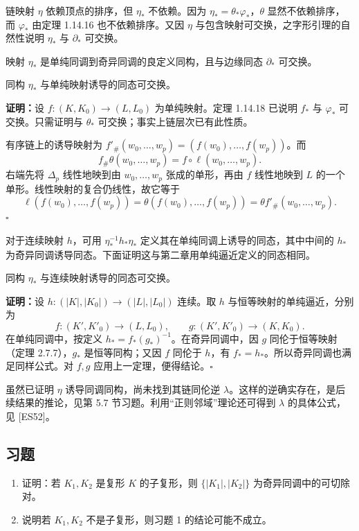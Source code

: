 链映射 $\eta$ 依赖顶点的排序，但 $\eta_*$ 不依赖。因为 $\eta_*=\theta_*\varphi_*$，$\theta$ 显然不依赖排序，而 $\varphi_*$ 由定理 1.14.16 也不依赖排序。又因 $\eta$ 与包含映射可交换，之字形引理的自然性说明 $\eta_*$ 与 $\partial_*$ 可交换。

映射 $\eta_*$ 是单纯同调到奇异同调的良定义同构，且与边缘同态 $\partial_*$ 可交换。

同构 $\eta_*$ 与单纯映射诱导的同态可交换。

\textbf{证明：}设 $f:(K,K_0)\to(L,L_0)$ 为单纯映射。定理 1.14.18 已说明 $f_*$ 与 $\varphi_*$ 可交换。只需证明与 $\theta_*$ 可交换；事实上链层次已有此性质。

有序链上的诱导映射为 $f'_\#(w_0,\ldots,w_p)=(f(w_0),\ldots,f(w_p))$。而
\[
f_\#\theta(w_0,\ldots,w_p)=f\circ\ell(w_0,\ldots,w_p).
\]
右端先将 $\Delta_p$ 线性地映到由 $w_0,\ldots,w_p$ 张成的单形，再由 $f$ 线性地映到 $L$ 的一个单形。线性映射的复合仍线性，故它等于
\[
\ell(f(w_0),\ldots,f(w_p))=\theta(f(w_0),\ldots,f(w_p))=\theta f'_\#(w_0,\ldots,w_p).
\]
\hfill$\square$

对于连续映射 $h$，可用 $\eta_*^{-1}h_*\eta_*$ 定义其在单纯同调上诱导的同态，其中中间的 $h_*$ 为奇异同调诱导同态。下面证明这与第二章用单纯逼近定义的同态相同。

同构 $\eta_*$ 与连续映射诱导的同态可交换。

\textbf{证明：}设 $h:(|K|,|K_0|)\to(|L|,|L_0|)$ 连续。取 $h$ 与恒等映射的单纯逼近，分别为
\[
f:(K',K'_0)\to(L,L_0),\qquad g:(K',K'_0)\to(K,K_0).
\]
在单纯同调中，按定义 $h_*=f_*(g_*)^{-1}$。在奇异同调中，因 $g$ 同伦于恒等映射（定理 2.7.7），$g_*$ 是恒等同构；又因 $f$ 同伦于 $h$，有 $f_*=h_*$。所以奇异同调也满足同样公式。对 $f,g$ 应用上一定理，便得结论。\hfill$\square$

虽然已证明 $\eta$ 诱导同调同构，尚未找到其链同伦逆 $\lambda$。这样的逆确实存在，是后续结果的推论，见第 5.7 节习题。利用“正则邻域”理论还可得到 $\lambda$ 的具体公式，见 [ES52]。

\subsection*{习题}
\begin{enumerate}
\item 证明：若 $K_1,K_2$ 是复形 $K$ 的子复形，则 $\{|K_1|,|K_2|\}$ 为奇异同调中的可切除对。
\item 说明若 $K_1,K_2$ 不是子复形，则习题 1 的结论可能不成立。
\end{enumerate}
